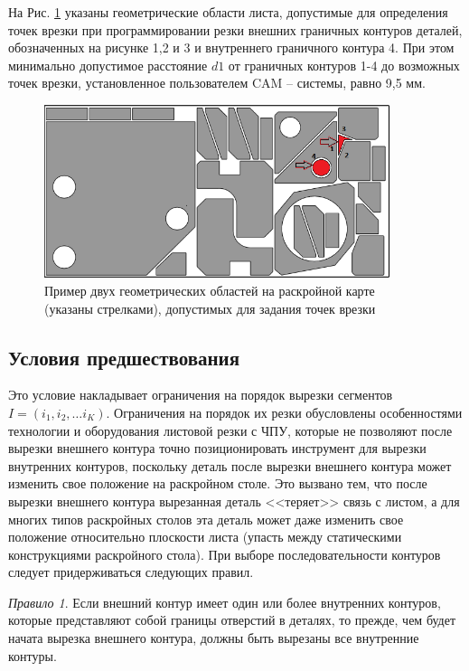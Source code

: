 \documentclass[11pt,twoside]{report}
\begin{document}
На Рис. \ref{pierce-area} указаны геометрические области листа,
допустимые для определения точек врезки при программировании резки
внешних граничных контуров деталей,
обозначенных на рисунке 1,2 и 3 и внутреннего граничного контура 4.
При этом минимально допустимое расстояние $d1$ от граничных контуров 1-4 до возможных точек врезки,
установленное пользователем CAM – системы, равно 9,5 мм.

\begin{figure}
  \begin{center}
  \includegraphics[width=0.9\textwidth]{pierce-area.png}
  \caption{Пример двух геометрических областей на раскройной карте (указаны стрелками),
допустимых для задания точек врезки }
  \label{pierce-area}
  \end{center}
\end{figure}

\subsection{Условия предшествования}

Это условие накладывает ограничения на порядок вырезки сегментов
$ I = (i_1, i_2, \dots i_K)$.
Ограничения на порядок их резки обусловлены особенностями
технологии и оборудования листовой резки с ЧПУ,
которые не позволяют после вырезки внешнего контура точно
позиционировать инструмент для вырезки внутренних контуров,
поскольку деталь после вырезки внешнего контура может
изменить свое положение на раскройном столе.
Это вызвано тем, что после вырезки внешнего контура
вырезанная деталь <<теряет>> связь с листом,
а для многих типов раскройных столов эта деталь
может даже изменить свое положение относительно плоскости листа
(упасть между статическими конструкциями раскройного стола).
При выборе последовательности контуров следует придерживаться следующих правил.

{\it Правило 1}.
Если внешний контур имеет один или более внутренних контуров,
которые представляют собой границы отверстий в деталях,
то прежде, чем будет начата вырезка внешнего контура,
должны быть вырезаны все внутренние контуры.
\end{document}
